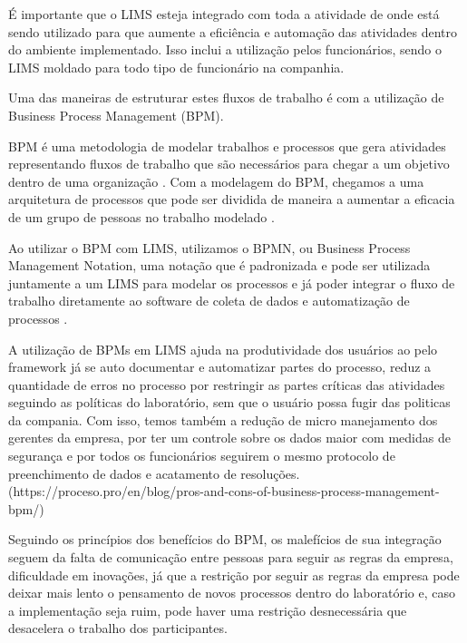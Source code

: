 
É importante que o LIMS esteja integrado com toda a atividade de onde está sendo utilizado para que aumente a eficiência e automação das atividades dentro do ambiente implementado. Isso inclui a utilização pelos funcionários, sendo o LIMS moldado para todo tipo de funcionário na companhia.

Uma das maneiras de estruturar estes fluxos de trabalho é com a utilização de Business Process Management (BPM).

BPM é uma metodologia de modelar trabalhos e processos que gera atividades representando fluxos de trabalho que são necessários para chegar a um objetivo dentro de uma organização \R. Com a modelagem do BPM, chegamos a uma arquitetura de processos que pode ser dividida de maneira a aumentar a eficacia de um grupo de pessoas no trabalho modelado \R.


Ao utilizar o BPM com LIMS, utilizamos o BPMN, ou Business Process Management Notation, uma notação que é padronizada \R e pode ser utilizada juntamente a um LIMS para modelar os processos e já poder integrar o fluxo de trabalho diretamente ao software de coleta de dados e automatização de processos \R.


A utilização de BPMs em LIMS ajuda na produtividade dos usuários ao pelo framework já se auto documentar e automatizar partes do processo, reduz a quantidade de erros no processo por restringir as partes críticas das atividades seguindo as políticas do laboratório, sem que o usuário possa fugir das politicas da compania.
Com isso, temos também a redução de micro manejamento dos gerentes da empresa, por ter um controle sobre os dados maior com medidas de segurança e por todos os funcionários seguirem o mesmo protocolo de preenchimento de dados e acatamento de resoluções. \R (https://proceso.pro/en/blog/pros-and-cons-of-business-process-management-bpm/)


Seguindo os princípios dos benefícios do BPM, os malefícios de sua integração seguem da falta de comunicação entre pessoas para seguir as regras da empresa, dificuldade em inovações, já que a restrição por seguir as regras da empresa pode deixar mais lento o pensamento de novos processos dentro do laboratório e, caso a implementação seja ruim, pode haver uma restrição desnecessária que desacelera o trabalho dos participantes. \R

